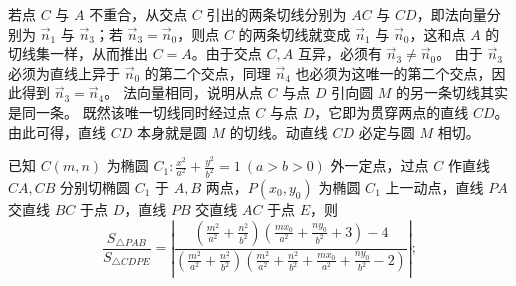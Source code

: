 \begin{solution}
若点 $C$ 与 $A$ 不重合，从交点 $C$ 引出的两条切线分别为 $AC$ 与 $CD$，即法向量分别为 $\vec{n}_1$ 与 $\vec{n}_3$；若 $\vec{n}_3 = \vec{n}_0$，则点 $C$ 的两条切线就变成 $\vec{n}_1$ 与 $\vec{n}_0$，这和点 $A$ 的切线集一样，从而推出 $C=A$。由于交点 $C, A$ 互异，必须有 $\vec{n}_3 \neq \vec{n}_0$。
由于 $\vec{n}_3$ 必须为直线上异于 $\vec{n}_0$ 的第二个交点，同理 $\vec{n}_4$ 也必须为这唯一的第二个交点，因此得到 $\vec{n}_3 = \vec{n}_4$。
法向量相同，说明从点 $C$ 与点 $D$ 引向圆 $M$ 的另一条切线其实是同一条。
既然该唯一切线同时经过点 $C$ 与点 $D$，它即为贯穿两点的直线 $CD$。
由此可得，直线 $CD$ 本身就是圆 $M$ 的切线。动直线 $CD$ 必定与圆 $M$ 相切。
\end{solution}




\begin{example}
已知 \(C(m,n)\) 为椭圆 \(C_1: \frac{x^2}{a^2} + \frac{y^2}{b^2} = 1\ (a>b>0)\) 外一定点，过点 \(C\) 作直线 \(CA,CB\) 分别切椭圆 \(C_1\) 于 \(A,B\) 两点，\(P(x_0,y_0)\) 为椭圆 \(C_1\) 上一动点，直线 \(PA\) 交直线 \(BC\) 于点 \(D\)，直线 \(PB\) 交直线 \(AC\) 于点 \(E\)，则
\[
\frac{S_{\triangle PAB}}{S_{\triangle CDPE}} = \left|
\frac{
\left( \frac{m^2}{a^2} + \frac{n^2}{b^2} \right)\left( \frac{mx_0}{a^2} + \frac{ny_0}{b^2} + 3 \right) - 4
}{
\left( \frac{m^2}{a^2} + \frac{n^2}{b^2} \right)\left( \frac{m^2}{a^2} + \frac{n^2}{b^2} + \frac{mx_0}{a^2} + \frac{ny_0}{b^2} - 2 \right)
}
\right|;
\]
\end{example}

